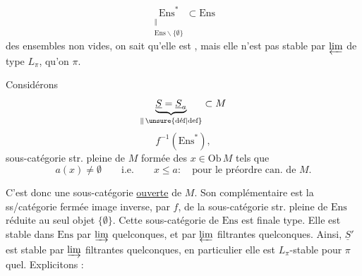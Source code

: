 
\[
\underset{\substack{\Vert\\ \mathrm{Ens}\smallsetminus\{\emptyset\}}}{\mathrm{Ens}^{*}}
 \subset \mathrm{Ens}
\]
des ensembles non vides, on sait qu'elle est ,
 mais elle n'est pas stable par
$\varprojlim$ de type $L_{\pi}$,   qu'on
 $\pi$.

Considérons
\[
\underbrace{\underline S=\underline S_a}_{\Vert\,\text{\unsure{déf|def}}}\subset M
\]
\[
f^{-1}(\mathrm{Ens}^{*}),
\]
sous-catégorie str. pleine de $M$ formée des $x\in\mathrm{Ob}\,M$ tels que
\[
a(x)\ne\emptyset \qquad\text{i.e.}\qquad x\leq a:\quad
\text{pour le préordre can. de }M.
\]

C'est donc une sous-catégorie \uline{ouverte} de $M$.
Son complémentaire 
 est la ss/catégorie
fermée image inverse, par $f$, de la sous-catégorie str. pleine
\deleted{$\unsure{\{\emptyset\}}$} de $\mathrm{Ens}$ réduite au seul objet
$\{\emptyset\}$. Cette sous-catégorie de $\mathrm{Ens}$ est
  finale type.
Elle est stable dans $\mathrm{Ens}$ par $\varinjlim$ quelconques, et
par $\varprojlim$ filtrantes quelconques. Ainsi,
$\underline S'$ est stable  par $\varinjlim$
filtrantes quelconques, en particulier elle est $L_{\pi}$-stable pour
$\pi$  quel. Explicitons :
